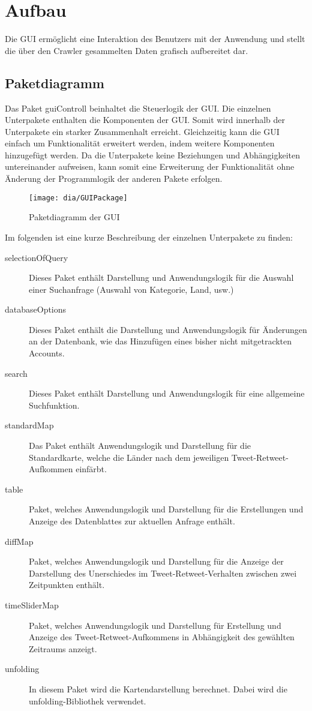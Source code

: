 \section{Aufbau}
Die GUI ermöglicht eine Interaktion des Benutzers mit der Anwendung und stellt die über den Crawler gesammelten Daten grafisch aufbereitet dar.\\
\subsection{Paketdiagramm}
Das Paket {guiControll} beinhaltet die Steuerlogik der GUI. Die einzelnen Unterpakete enthalten die Komponenten der GUI. Somit wird innerhalb der Unterpakete ein starker Zusammenhalt erreicht. Gleichzeitig kann die GUI einfach um Funktionalität erweitert werden, indem weitere Komponenten hinzugefügt werden. Da die Unterpakete keine Beziehungen und Abhängigkeiten untereinander aufweisen, kann somit eine Erweiterung der Funktionalität ohne Änderung der Programmlogik der anderen Pakete erfolgen. 
\begin{figure}[h!]
	\centering
	\texttt{[image: dia/GUIPackage]}
	\caption{Paketdiagramm der GUI}
	\label{fig:GUI}
\end{figure}


Im folgenden ist eine kurze Beschreibung der einzelnen Unterpakete zu finden:
\begin{description}
		\item [selectionOfQuery] Dieses Paket enthält Darstellung und Anwendungslogik für die Auswahl einer Suchanfrage (Auswahl von Kategorie, Land, usw.)
		\item[databaseOptions] Dieses Paket enthält die Darstellung und Anwendungslogik für Änderungen an der Datenbank, wie das Hinzufügen eines bisher nicht mitgetrackten Accounts.
		\item[search] Dieses Paket enthält Darstellung und Anwendungslogik für eine allgemeine Suchfunktion.
		\item [standardMap] Das Paket enthält Anwendungslogik und Darstellung für die Standardkarte, welche die Länder nach dem jeweiligen Tweet-Retweet-Aufkommen einfärbt.
		\item [table] Paket, welches Anwendungslogik und Darstellung für die Erstellungen und Anzeige des Datenblattes zur aktuellen Anfrage enthält.
		\item[diffMap] Paket, welches Anwendungslogik und Darstellung für die Anzeige der Darstellung des Unerschiedes im Tweet-Retweet-Verhalten zwischen zwei Zeitpunkten enthält.
		\item [timeSliderMap] Paket, welches Anwendungslogik und Darstellung für Erstellung und Anzeige des Tweet-Retweet-Aufkommens in Abhängigkeit des gewählten Zeitraums anzeigt.
		\item [unfolding] In diesem Paket wird die Kartendarstellung berechnet. Dabei wird die unfolding-Bibliothek verwendet.
		
\end{description}

